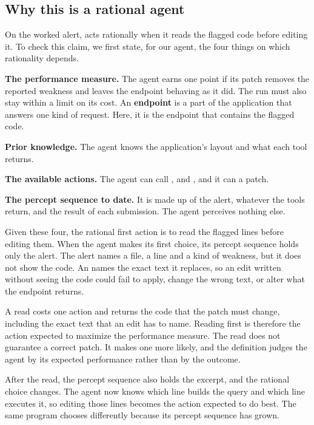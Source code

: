 \subsection{Why this is a rational agent}
\label{sec:agents-why-rational}

On the worked alert, \msa{} acts rationally when it reads the flagged code before editing it. To
check this claim, we first state, for our agent, the four things on which rationality depends.
\bi
\item \textbf{The performance measure.} The agent earns one point if its patch removes the
reported weakness and leaves the endpoint behaving as it did. The run must also stay within a limit
on its cost. An \textbf{endpoint} is a part of the application that answers one kind of request.
Here, it is the endpoint that contains the flagged code.
\item \textbf{Prior knowledge.} The agent knows the application's layout and what each tool
returns.
\item \textbf{The available actions.} The agent can call ,  and
, and it can  a patch.
\item \textbf{The percept sequence to date.} It is made up of the alert, whatever the tools return,
and the result of each submission. The agent perceives nothing else.
\ei

Given these four, the rational first action is to read the flagged lines before editing them. When
the agent makes its first choice, its percept sequence holds only the alert. The alert names a
file, a line and a kind of weakness, but it does not show the code. An  names the
exact text it replaces, so an edit written without seeing the code could fail to apply, change the
wrong text, or alter what the endpoint returns.

A read costs one action and returns the code that the patch must change, including the exact text
that an edit has to name. Reading first is therefore the action expected to maximize the
performance measure. The read does not guarantee a correct patch. It makes one more likely, and the
definition judges the agent by its expected performance rather than by the outcome.

After the read, the percept sequence also holds the excerpt, and the rational choice changes. The
agent now knows which line builds the query and which line executes it, so editing those lines
becomes the action expected to do best. The same program chooses differently because its percept
sequence has grown.

